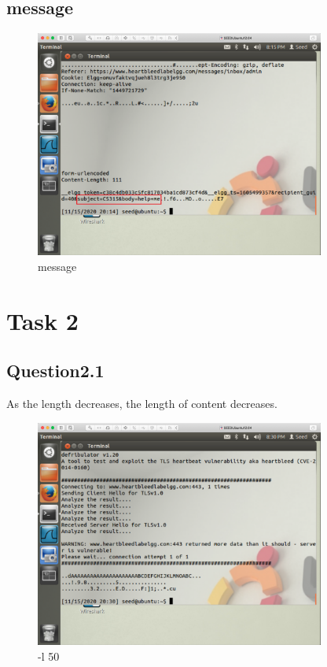 \documentclass[onecolumn,oneside]{SUSTechHomework}
\begin{document}
\subsection*{message}

\begin{figure}[H]
  \centering
  \includegraphics[width=0.85\textwidth]{img/p3.png}
  \caption{message}
\end{figure}

\section*{Task 2}

\subsection*{Question2.1}

As the length decreases, the length of content decreases.

\begin{figure}[H]
  \centering
  \includegraphics[width=0.85\textwidth]{img/p5.png}
  \caption{-l 50}
\end{figure}
\end{document}
